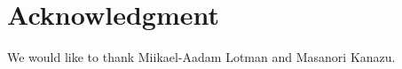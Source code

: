 \documentclass[conference]{IEEEtran}
\begin{document}
%







\section*{Acknowledgment}
We would like to thank Miikael-Aadam Lotman and Masanori Kanazu.





\end{document}
